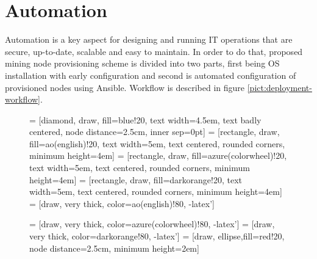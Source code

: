 \documentclass[
  printed, %
  table,   %
  nolof,     %
  nolot,     %
           oneside, color
]{fithesis3}
\renewcommand{\texttt}[1]{%
  \begingroup
  \ttfamily
  \begingroup\lccode`~=`/\lowercase{\endgroup\def~}{/\discretionary{}{}{}}%
  \begingroup\lccode`~=`[\lowercase{\endgroup\def~}{[\discretionary{}{}{}}%
  \begingroup\lccode`~=`.\lowercase{\endgroup\def~}{.\discretionary{}{}{}}%
  \catcode`/=\active\catcode`[=\active\catcode`.=\active
  \scantokens{#1\noexpand}%
  \endgroup
}
\begin{document}
\section{Automation}
Automation is a key aspect for designing and running IT operations that are secure, up-to-date, scalable and easy to maintain. In order to do that, proposed mining node provisioning scheme is divided into two parts, first being OS installation with early configuration and second is automated configuration of provisioned nodes using Ansible. Workflow is described in figure \ref{pict:deployment-workflow}.
\begin{figure}[H]
\center
{} = [diamond, draw, fill=blue!20,
    text width=4.5em, text badly centered, node distance=2.5cm, inner sep=0pt]
 = [rectangle, draw, fill=ao(english)!20,
    text width=5em, text centered, rounded corners, minimum height=4em]
 = [rectangle, draw, fill=azure(colorwheel)!20,
    text width=5em, text centered, rounded corners, minimum height=4em]
 = [rectangle, draw, fill=darkorange!20,
    text width=5em, text centered, rounded corners, minimum height=4em]
 = [draw, very thick, color=ao(english)!80, -latex']

 = [draw, very thick, color=azure(colorwheel)!80, -latex']
 = [draw, very thick, color=darkorange!80, -latex']
 = [draw, ellipse,fill=red!20, node distance=2.5cm,
    minimum height=2em]

\end{figure}
\end{document}
